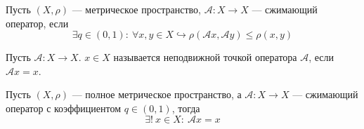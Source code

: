 \documentclass[11pt]{article}
\begin{document}
\begin{definition}
    Пусть $(X, \rho)$ --- метрическое пространство, $\mathcal{A}: X \to X$ --- сжимающий оператор, если 
    \[\exists q \in (0, 1): \ \forall x, y \in X \hookrightarrow \rho(\mathcal{A}x, \mathcal{A}y) \leq \rho(x, y)\]
\end{definition}

\begin{definition}
    Пусть $\mathcal{A}: X \to X$. $x \in X$ называется неподвижной точкой оператора $\mathcal{A}$, если $\mathcal{A}x = x$.
\end{definition}

\begin{theorem}[Банаха]
    Пусть $(X, \rho)$ --- полное метрическое пространство, а $\mathcal{A}: X \to X$ --- сжимающий оператор с коэффициентом $q \in (0, 1)$, 
    тогда \[\exists! \ x \in X: \ \mathcal{A}x = x\]
\end{theorem}
\end{document}
